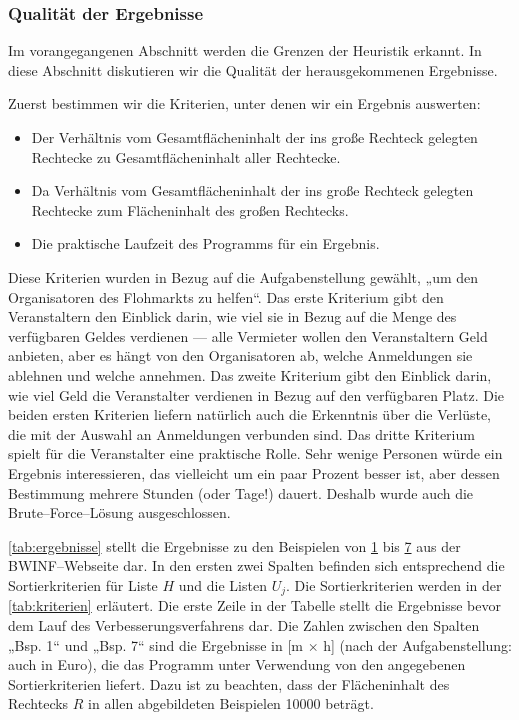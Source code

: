 \subsubsection{Qualität der Ergebnisse}\label{sec:diskussion-ergebnisse}
Im vorangegangenen Abschnitt werden die Grenzen der Heuristik erkannt. 
In diese Abschnitt diskutieren wir die Qualität der herausgekommenen Ergebnisse.

Zuerst bestimmen wir die Kriterien, unter denen wir ein Ergebnis auswerten:
\begin{itemize}
	\item Der Verhältnis vom Gesamtflächeninhalt der ins große Rechteck gelegten Rechtecke 
	zu Gesamtflächeninhalt aller Rechtecke.
	\item Da Verhältnis vom Gesamtflächeninhalt der ins große Rechteck gelegten Rechtecke 
	zum Flächeninhalt des großen Rechtecks.
	\item Die praktische Laufzeit des Programms für ein Ergebnis.
\end{itemize}

Diese Kriterien wurden in Bezug auf die Aufgabenstellung gewählt,
„um den Organisatoren des Flohmarkts zu helfen“.
Das erste Kriterium gibt den Veranstaltern den Einblick darin,
wie viel sie in Bezug auf die Menge des verfügbaren Geldes verdienen ---
alle Vermieter wollen den Veranstaltern Geld anbieten, aber es hängt von den 
Organisatoren ab, welche Anmeldungen sie ablehnen und welche annehmen.
Das zweite Kriterium gibt den Einblick darin, wie viel Geld die 
Veranstalter verdienen in Bezug auf den verfügbaren Platz. 
Die beiden ersten Kriterien liefern natürlich auch die Erkenntnis über die Verlüste, die 
mit der Auswahl an Anmeldungen verbunden sind.
Das dritte Kriterium spielt für die Veranstalter eine praktische Rolle.
Sehr wenige Personen würde ein Ergebnis interessieren, das vielleicht um ein paar Prozent 
besser ist, aber dessen Bestimmung mehrere Stunden (oder Tage!) dauert. 
Deshalb wurde auch die Brute--Force--Lösung ausgeschlossen.

\cref{tab:ergebnisse} stellt die Ergebnisse zu den Beispielen von \hyperref[ex:1]{1} bis \hyperref[ex:7]{7}
aus der BWINF--Webseite dar.
In den ersten zwei Spalten befinden sich entsprechend die Sortierkriterien für Liste
$H$ und die Listen $U_j$. Die Sortierkriterien werden in der \cref{tab:kriterien} erläutert.
Die erste Zeile in der Tabelle stellt die Ergebnisse bevor dem Lauf des Verbesserungsverfahrens dar.
Die Zahlen zwischen den Spalten „Bsp. 1“ und „Bsp. 7“ sind die Ergebnisse in [m $\times$ h]
(nach der Aufgabenstellung: auch in Euro),
die das Programm unter Verwendung von den angegebenen Sortierkriterien liefert.
Dazu ist zu beachten, dass der Flächeninhalt des Rechtecks $R$ in allen abgebildeten Beispielen
10000 beträgt.
 
